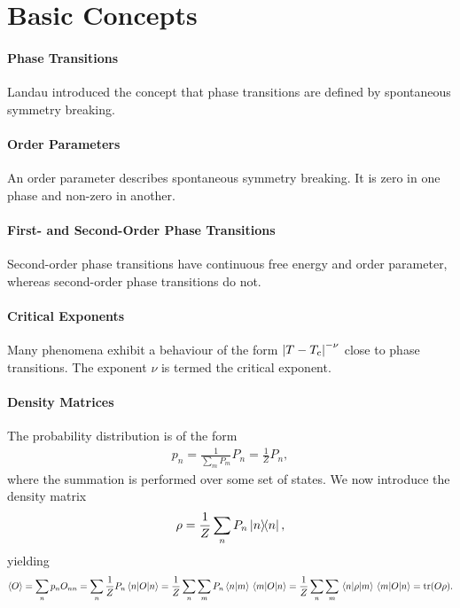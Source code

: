 \section{Basic Concepts}

\paragraph{Phase Transitions}
Landau introduced the concept that phase transitions are defined by spontaneous symmetry breaking.

\paragraph{Order Parameters}
An order parameter describes spontaneous symmetry breaking. It is zero in one phase and non-zero in another.

\paragraph{First- and Second-Order Phase Transitions}
Second-order phase transitions have continuous free energy and order parameter, whereas second-order phase transitions do not.

\paragraph{Critical Exponents}
Many phenomena exhibit a behaviour of the form $\abs{T - T_{\text{c}}}^{-\nu}$ close to phase transitions. The exponent $\nu$ is termed the critical exponent.

\paragraph{Density Matrices}
The probability distribution is of the form
\begin{align*}
	p_{n} = \frac{1}{\sum\limits_{m}P_{m}}P_{n} = \frac{1}{Z}P_{n},
\end{align*}
where the summation is performed over some set of states. We now introduce the density matrix
\begin{align*}
	\rho = \frac{1}{Z}\sum\limits_{n}P_{n}\op{n}{n},
\end{align*}
yielding
\begin{align*}
	\expval{O} = \sum\limits_{n}p_{n}O_{nn} = \sum\limits_{n}\frac{1}{Z}P_{n}\expval{O}{n} = \frac{1}{Z}\sum\limits_{n}\sum\limits_{m}P_{n}\braket{n}{m}\mel{m}{O}{n} = \frac{1}{Z}\sum\limits_{n}\sum\limits_{m}\mel{n}{\rho}{m}\mel{m}{O}{n} = \tr(O\rho).
\end{align*}

